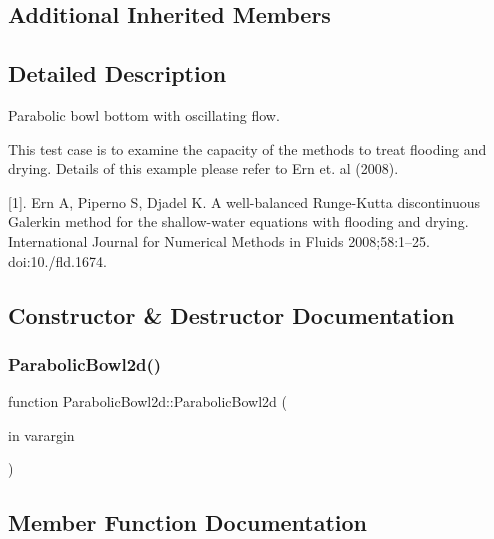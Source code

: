 \subsection*{Additional Inherited Members}


\subsection{Detailed Description}
Parabolic bowl bottom with oscillating flow. 

This test case is to examine the capacity of the methods to treat flooding and drying. Details of this example please refer to Ern et. al (2008).

\mbox{[}1\mbox{]}. Ern A, Piperno S, Djadel K. A well-\/balanced Runge-\/\+Kutta discontinuous Galerkin method for the shallow-\/water equations with flooding and drying. International Journal for Numerical Methods in Fluids 2008;58\+:1–25. doi\+:10./fld.1674. 

\subsection{Constructor \& Destructor Documentation}
\mbox{\label{class_parabolic_bowl2d_a3cf3b16ee5279cc0a9c6782e0bbd40cd}} 
\subsubsection{\texorpdfstring{Parabolic\+Bowl2d()}{ParabolicBowl2d()}}
{\footnotesize\ttfamily function Parabolic\+Bowl2d\+::\+Parabolic\+Bowl2d (\begin{DoxyParamCaption}\item[{in}]{varargin }\end{DoxyParamCaption})}



\subsection{Member Function Documentation}
\mbox{\label{class_parabolic_bowl2d_acf9645dce26099da0f6347d47b80c307}} 
